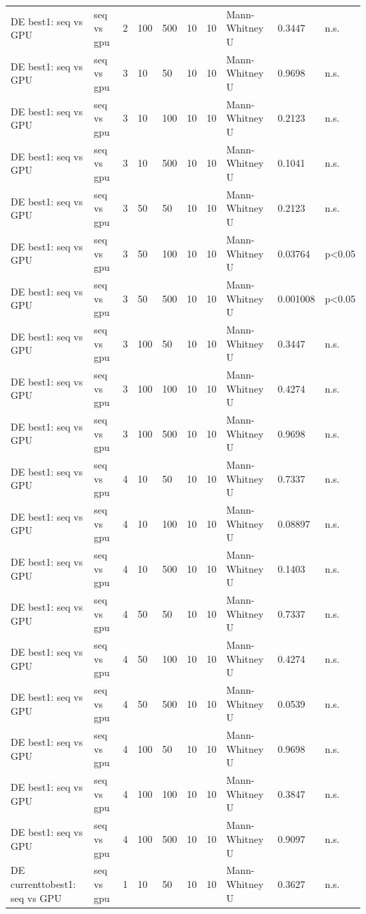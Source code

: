\begin{table}[t]
\begin{tabular}{llllllllll}
DE best1: seq vs GPU & seq vs gpu & 2 & 100 & 500 & 10 & 10 & Mann-Whitney U & 0.3447 & n.s. \\
DE best1: seq vs GPU & seq vs gpu & 3 & 10 & 50 & 10 & 10 & Mann-Whitney U & 0.9698 & n.s. \\
DE best1: seq vs GPU & seq vs gpu & 3 & 10 & 100 & 10 & 10 & Mann-Whitney U & 0.2123 & n.s. \\
DE best1: seq vs GPU & seq vs gpu & 3 & 10 & 500 & 10 & 10 & Mann-Whitney U & 0.1041 & n.s. \\
DE best1: seq vs GPU & seq vs gpu & 3 & 50 & 50 & 10 & 10 & Mann-Whitney U & 0.2123 & n.s. \\
DE best1: seq vs GPU & seq vs gpu & 3 & 50 & 100 & 10 & 10 & Mann-Whitney U & 0.03764 & p<0.05 \\
DE best1: seq vs GPU & seq vs gpu & 3 & 50 & 500 & 10 & 10 & Mann-Whitney U & 0.001008 & p<0.05 \\
DE best1: seq vs GPU & seq vs gpu & 3 & 100 & 50 & 10 & 10 & Mann-Whitney U & 0.3447 & n.s. \\
DE best1: seq vs GPU & seq vs gpu & 3 & 100 & 100 & 10 & 10 & Mann-Whitney U & 0.4274 & n.s. \\
DE best1: seq vs GPU & seq vs gpu & 3 & 100 & 500 & 10 & 10 & Mann-Whitney U & 0.9698 & n.s. \\
DE best1: seq vs GPU & seq vs gpu & 4 & 10 & 50 & 10 & 10 & Mann-Whitney U & 0.7337 & n.s. \\
DE best1: seq vs GPU & seq vs gpu & 4 & 10 & 100 & 10 & 10 & Mann-Whitney U & 0.08897 & n.s. \\
DE best1: seq vs GPU & seq vs gpu & 4 & 10 & 500 & 10 & 10 & Mann-Whitney U & 0.1403 & n.s. \\
DE best1: seq vs GPU & seq vs gpu & 4 & 50 & 50 & 10 & 10 & Mann-Whitney U & 0.7337 & n.s. \\
DE best1: seq vs GPU & seq vs gpu & 4 & 50 & 100 & 10 & 10 & Mann-Whitney U & 0.4274 & n.s. \\
DE best1: seq vs GPU & seq vs gpu & 4 & 50 & 500 & 10 & 10 & Mann-Whitney U & 0.0539 & n.s. \\
DE best1: seq vs GPU & seq vs gpu & 4 & 100 & 50 & 10 & 10 & Mann-Whitney U & 0.9698 & n.s. \\
DE best1: seq vs GPU & seq vs gpu & 4 & 100 & 100 & 10 & 10 & Mann-Whitney U & 0.3847 & n.s. \\
DE best1: seq vs GPU & seq vs gpu & 4 & 100 & 500 & 10 & 10 & Mann-Whitney U & 0.9097 & n.s. \\
DE currenttobest1: seq vs GPU & seq vs gpu & 1 & 10 & 50 & 10 & 10 & Mann-Whitney U & 0.3627 & n.s. \\

\end{tabular}
\end{table}
